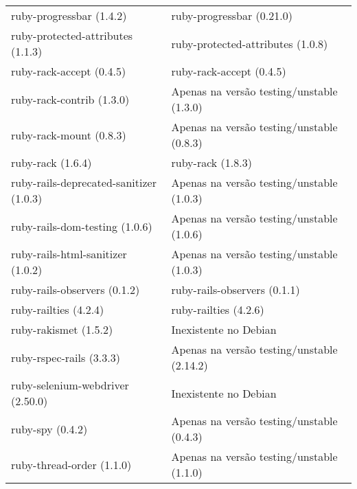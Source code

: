 \begin{anexosenv}
\begin{longtable}[H]{l|l}
        ruby-progressbar (1.4.2)                         & ruby-progressbar (0.21.0)                                         \\
        ruby-protected-attributes (1.1.3)                & ruby-protected-attributes (1.0.8)                                  \\
        ruby-rack-accept (0.4.5)                         & ruby-rack-accept (0.4.5)                                  \\
        ruby-rack-contrib (1.3.0)                        & Apenas na versão testing/unstable (1.3.0)                                  \\
        ruby-rack-mount (0.8.3)                          & Apenas na versão testing/unstable (0.8.3)                                  \\
        ruby-rack (1.6.4)                                & ruby-rack (1.8.3)                                  \\
        ruby-rails-deprecated-sanitizer (1.0.3)          & Apenas na versão testing/unstable (1.0.3)                                  \\
        ruby-rails-dom-testing (1.0.6)                   & Apenas na versão testing/unstable (1.0.6)                                  \\
        ruby-rails-html-sanitizer (1.0.2)                & Apenas na versão testing/unstable (1.0.3)                                  \\
        ruby-rails-observers (0.1.2)                     & ruby-rails-observers (0.1.1)                                  \\
        ruby-railties (4.2.4)                            & ruby-railties (4.2.6)                                  \\
        ruby-rakismet (1.5.2)                            & Inexistente no Debian                                  \\
        ruby-rspec-rails (3.3.3)                         & Apenas na versão testing/unstable (2.14.2)                                  \\
        ruby-selenium-webdriver (2.50.0)                 & Inexistente no Debian                                  \\
        ruby-spy (0.4.2)                                 & Apenas na versão testing/unstable (0.4.3)                                  \\
        ruby-thread-order (1.1.0)                        & Apenas na versão testing/unstable (1.1.0)                                  \\

\end{longtable}
\end{anexosenv}
